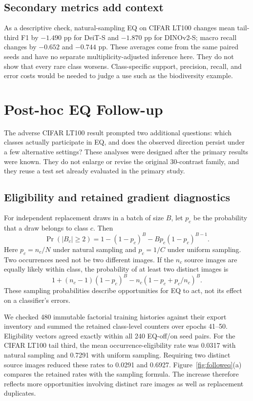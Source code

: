\documentclass[conference]{IEEEtran}
\begin{document}
\subsection{Secondary metrics add context}
As a descriptive check, natural-sampling EQ on CIFAR LT100 changes mean tail-third F1 by $-1.490$ pp for DeiT-S and $-1.870$ pp for DINOv2-S; macro recall changes by $-0.652$ and $-0.744$ pp. These averages come from the same paired seeds and have no separate multiplicity-adjusted inference here. They do not show that every rare class worsens. Class-specific support, precision, recall, and error costs would be needed to judge a use such as the biodiversity example.


\FloatBarrier
\section{Post-hoc EQ Follow-up}
\label{sec:eqfollow}
The adverse CIFAR LT100 result prompted two additional questions: which classes actually participate in EQ, and does the observed direction persist under a few alternative settings? These analyses were designed after the primary results were known. They do not enlarge or revise the original 30-contrast family, and they reuse a test set already evaluated in the primary study.

\subsection{Eligibility and retained gradient diagnostics}
For independent replacement draws in a batch of size $B$, let $p_c$ be the probability that a draw belongs to class $c$. Then
\begin{equation}
\Pr(|B_c|\geq2)=1-(1-p_c)^B-Bp_c(1-p_c)^{B-1}.
\end{equation}
Here $p_c=n_c/N$ under natural sampling and $p_c=1/C$ under uniform sampling. Two occurrences need not be two different images. If the $n_c$ source images are equally likely within class, the probability of at least two distinct images is
\begin{equation}
1+(n_c-1)(1-p_c)^B-n_c(1-p_c+p_c/n_c)^B.
\end{equation}
These sampling probabilities describe opportunities for EQ to act, not its effect on a classifier's errors.

We checked 480 immutable factorial training histories against their export inventory and summed the retained class-level counters over epochs 41--50. Eligibility vectors agreed exactly within all 240 EQ-off/on seed pairs. For the CIFAR LT100 tail third, the mean occurrence-eligibility rate was 0.0317 with natural sampling and 0.7291 with uniform sampling. Requiring two distinct source images reduced these rates to 0.0291 and 0.6927. Figure~\ref{fig:followeq}(a) compares the retained rates with the sampling formula. The increase therefore reflects more opportunities involving distinct rare images as well as replacement duplicates.
\end{document}

